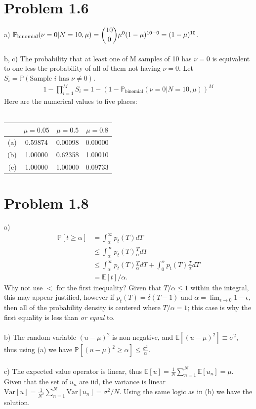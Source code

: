 \documentclass[11pt,letterpaper]{article}
\newcommand{\p}[0]{\mathbb{P}}
\newcommand{\e}[0]{\mathbb{E}}
\newcommand{\var}[0]{\textrm{Var}}
\begin{document}
\section*{Problem 1.6}

a) $\p_\textrm{binomial}(\nu = 0 | N = 10, \mu) = \dbinom{10}{0} \mu^0 (1 - \mu)^{10 - 0} = (1 - \mu)^{10}$.
\\\\
b, c) The probability that at least one of M samples of 10 has $\nu = 0$ is equivalent to one less the probability of all of them not having $\nu = 0$.  Let $S_i = \p(\textrm{Sample $i$ has $\nu \ne 0$})$.
\begin{align*}
    1 - \prod_{i = 1}^{M} S_i = 1 - (1 - \p_\textrm{binomial}(\nu = 0 | N = 10, \mu))^M
\end{align*}
Here are the numerical values to five places:
\\\\
\begin{tabular}{|r|c|c|c|}
    \hline
    & $\mu = 0.05$ & $\mu = 0.5$ & $\mu = 0.8$ 
    \\ \hline
    (a) & 0.59874 & 0.00098 & 0.00000 
    \\ \hline
    (b) & 1.00000 & 0.62358 & 1.00010 
    \\ \hline
    (c) & 1.00000 & 1.00000 & 0.09733 
    \\ \hline
\end{tabular}

\section*{Problem 1.8}
a)
\begin{align*}
\p[t \ge \alpha] &= \int_\alpha^\infty p_t(T) dT \\
&\le \int_\alpha^\infty p_t(T) \frac{T}{\alpha} dT \\
&\le \int_\alpha^\infty p_t(T) \frac{T}{\alpha} dT + \int_0^\alpha p_t(T) \frac{T}{\alpha} dT \\
&= \e[t]/\alpha.
\end{align*}
Why not use $<$ for the first inequality?  Given that $T/\alpha \le 1$ within the integral, this may appear justified, however if $p_t(T) = \delta(T - 1)$ and $\alpha = \lim_{\epsilon \rightarrow 0} 1 - \epsilon$, then all of the probability density is centered where $T/\alpha = 1$; this case is why the first equality is less than \emph{or equal} to.
\\\\
b) The random variable $(u - \mu)^2$ is non-negative, and $\e[(u - \mu)^2] \equiv \sigma^2$, thus using (a) we have $\p[(u - \mu)^2 \ge \alpha] \le \frac{\sigma^2}{\alpha}$.
\\\\
c) The expected value operator is linear, thus $\e[u] = \frac{1}{N}\sum_{n=1}^N \e[u_n] = \mu$.  Given that the set of $u_n$ are iid, the variance is linear $\var[u] = \frac{1}{N^2}\sum_{n=1}^N \var[u_n] = \sigma^2/N$.  Using the same logic as in (b) we have the solution.  
\end{document}
